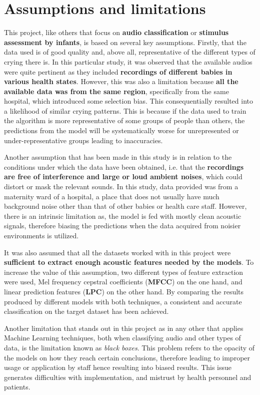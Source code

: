 \section{Assumptions and limitations}
This project, like others that focus on \textbf{audio classification} or \textbf{stimulus assessment by infants}, is based on several key assumptions. Firstly, that the data used is of good quality and, above all, representative of the different types of crying there is. In this particular study, it was observed that the available audios were quite pertinent as they included \textbf{recordings of different babies in various health states}. However, this was also a limitation because \textbf{all the available data was from the same region}, specifically from the same hospital, which introduced some selection bias. This consequentially resulted into a likelihood of similar crying patterns. This is because if the data used to train the algorithm is more representative of some groups of people than others, the predictions from the model will be systematically worse for unrepresented or under-representative groups leading to inaccuracies. 


Another assumption that has been made in this study is in relation to the conditions under which the data have been obtained, i.e. that the \textbf{recordings are free of interference and large or loud ambient noises}, which could distort or mask the relevant sounds. In this study, data provided was from a maternity ward of a hospital, a place that does not usually have much background noise other than that of other babies or health care staff. However, there is an intrinsic limitation as, the model is fed with mostly clean acoustic signals, therefore biasing the predictions when the data acquired from noisier environments is utilized. 

It was also assumed that all the datasets worked with in this project were \textbf{sufficient to extract enough acoustic features needed by the models}. To increase the value of this assumption, two different types of feature extraction were used, Mel frequency cepstral coefficients (\textbf{MFCC}) on the one hand, and linear prediction features (\textbf{LPC}) on the other hand. By comparing the results produced by different models with both techniques, a consistent and accurate classification on the target dataset has been achieved.

Another limitation that stands out in this project as in any other that applies Machine Learning techniques, both when classifying audio and other types of data, is the limitation known as \textit{black boxes}\cite{rocha_how_2023}. This problem refers to the opacity of the models on how they reach certain conclusions, therefore leading to improper usage or application by staff hence resulting into biased results. This issue generates difficulties with implementation, and mistrust by health personnel and patients.

